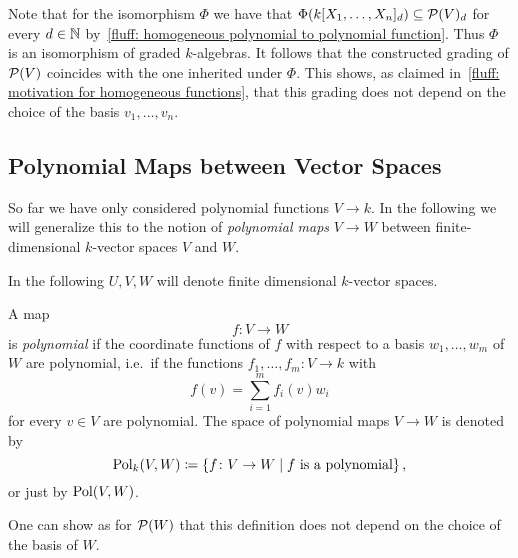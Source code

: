 \begin{fluff}
  Note that for the isomorphism $\Phi$ we have that $\Phi( k[X_1, \dotsc, X_n]_d ) \subseteq \mathcal{P}(V)_d$ for every $d \in \mathbb{N}$ by~\ref{fluff: homogeneous polynomial to polynomial function}.
  Thus $\Phi$ is an isomorphism of graded $k$-algebras.
  It follows that the constructed grading of $\mathcal{P}(V)$ coincides with the one inherited under $\Phi$.
  This shows, as claimed in~\ref{fluff: motivation for homogeneous functions}, that this grading does not depend on the choice of the basis $v_1, \dotsc, v_n$.
\end{fluff}







\subsection{Polynomial Maps between Vector Spaces}

\begin{fluff}
  So far we have only considered polynomial functions $V \to k$.
  In the following we will generalize this to the notion of \emph{polynomial maps} $V \to W$ between finite-dimensional $k$-vector spaces $V$ and $W$.
  
  In the following $U, V, W$ will denote finite dimensional $k$-vector spaces.
\end{fluff}


\begin{definition}
  A map
  \[
            f
    \colon  V
    \to     W
  \]
  is \emph{polynomial} if the coordinate functions of $f$ with respect to a basis $w_1, \dotsc, w_m$ of $W$ are polynomial, i.e.\ if the functions $f_1, \dotsc, f_m \colon V \to k$ with
  \[
      f(v)
    = \sum_{i=1}^m f_i(v) w_i
  \]
  for every $v \in V$ are polynomial.
  The space of polynomial maps $V \to W$ is denoted by
  \[
              \operatorname{Pol}_k(V,W)
    \coloneqq  \{
                        f
                \colon  V
                \to     W
              \mid
                \text{$f$ is a polynomial}
              \} \,,
  \]
  or just by $\operatorname{Pol}(V,W)$.
\end{definition}


\begin{remark}
  One can show as for $\mathcal{P}(W)$ that this definition does not depend on the choice of the basis of $W$.
\end{remark}


